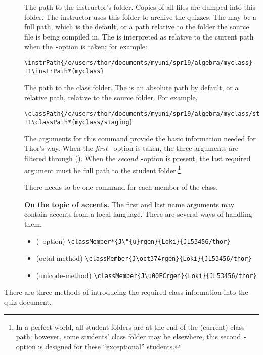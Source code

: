 \documentclass{article}
\begin{document}
\begin{description}
  \item[] The path to the instructor's folder. Copies of all
      files are dumped into this folder. The instructor uses this folder to
      archive the quizzes. The  may be a full path, which is the
      default, or a path relative to the folder the source file is being
      compiled in. The  is interpreted as relative to the
      current path when the \texttt*-option is taken; for example:
\setlength{}
\def\1{\rlap{\hskip\eflength\%\sffamily\space assumes source is in the algebra folder}}
\begin{Verbatim}[fontsize=\small,commandchars=!()]
\instrPath{/c/users/thor/documents/myuni/spr19/algebra/myclass}
!1\instrPath*{myclass}
\end{Verbatim}
  \item[] The path to the class folder. The  is an absolute
  path by default, or a relative path, relative to the source folder. For example,

\setlength{}
\begin{Verbatim}[fontsize=\small,commandchars=!()]
\classPath{/c/users/thor/documents/myuni/spr19/algebra/myclass/staging}
!1\classPath*{myclass/staging}
\end{Verbatim}
  \item[] The arguments for this command provide the basic
      information needed for Thor's way. When the \emph{first} \texttt*-option is taken,
      the three arguments are filtered through 
      (). When the \emph{second} \texttt*-option is present, the last required
      argument  must be full path to the student folder.\footnote{In a perfect world,
      all student folders are at the end of the (current) class path; however, some students' class folder
      may be elsewhere, this second \texttt*-option is designed for these ``exceptional'' students.}

      There needs to be one  command for
      each member of the class.

      \textbf{On the topic of accents.} The first and last name arguments
      may contain accents from a local language. There are several ways of
      handling them.
      \begin{itemize}
        \item (\texttt*-option) \verb~\classMember*{J\"{u}rgen}{Loki}{JL53456/thor}~
        \item (octal-method) \verb~\classMember{J\oct374rgen}{Loki}{JL53456/thor}~
        \item (unicode-method) \verb~\classMember{J\u00FCrgen}{Loki}{JL53456/thor}~
      \end{itemize}
\end{description}
There are three methods of introducing the required class information into the quiz document.
\end{document}

